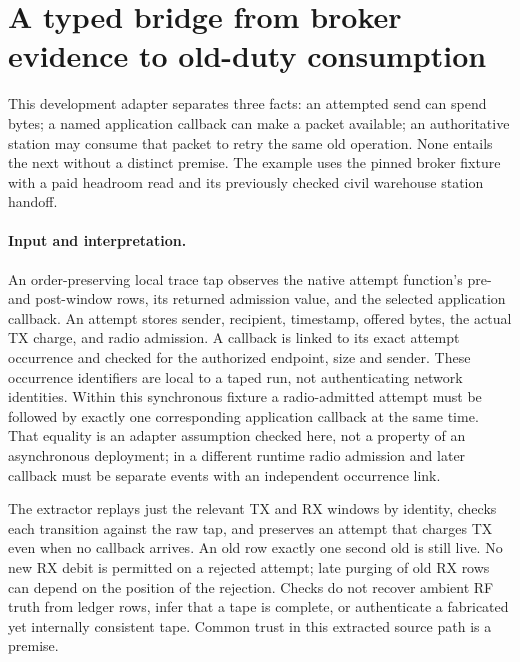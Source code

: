 \documentclass{article}
\begin{document}
\section*{A typed bridge from broker evidence to old-duty consumption}
This development adapter separates three facts: an attempted send can
spend bytes; a named application callback can make a packet available;
an authoritative station may consume that packet to retry the same old
operation. None entails the next without a distinct premise. The
example uses the pinned broker fixture with a paid headroom read and
its previously checked civil warehouse station handoff.

\paragraph{Input and interpretation.}
An order-preserving local trace tap observes the native attempt
function's pre- and post-window rows, its returned admission value,
and the selected application callback. An attempt stores sender,
recipient, timestamp, offered bytes, the actual TX charge, and
radio admission. A callback is linked to its exact attempt occurrence
and checked for the authorized endpoint, size and sender. These
occurrence identifiers are local to a taped run, not authenticating
network identities. Within this synchronous fixture a radio-admitted
attempt must be followed by exactly one corresponding application
callback at the same time. That equality is an adapter assumption
checked here, not a property of an asynchronous deployment; in a
different runtime radio admission and later callback must be separate
events with an independent occurrence link.

The extractor replays just the relevant TX and RX windows by identity,
checks each transition against the raw tap, and preserves an attempt
that charges TX even when no callback arrives. An old row exactly one
second old is still live. No new RX debit is permitted on a rejected
attempt; late purging of old RX rows can depend on the position of
the rejection. Checks do not recover ambient RF truth from ledger
rows, infer that a tape is complete, or authenticate a fabricated
yet internally consistent tape. Common trust in this extracted
source path is a premise.
\end{document}
